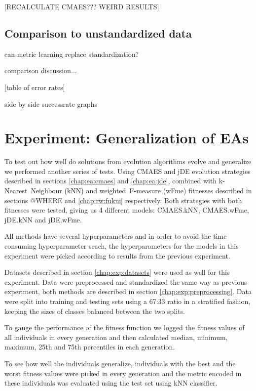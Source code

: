 \documentclass[12pt,a4paper]{report}
\begin{document}
[RECALCULATE CMAES??? WEIRD RESULTS] %


\subsection{Comparison to unstandardized data}

can metric learning replace standardization? %

comparison discussion... %

[table of error rates] %

side by side successrate graphs %


\section{Experiment: Generalization of EAs} \label{chap:exp:fitness}

To test out how well do solutions from evolution algorithms evolve and generalize we performed another series of tests. Using CMAES and jDE evolution strategies described in sections \ref{chap:ea:cmaes} and \ref{chap:ea:jde}, combined with k-Nearest~Neighbour (kNN) and weighted~F-measure (wFme) fitnesses described in sections @WHERE and \ref{chap:rw:fukui} respectively. Both strategies with both fitnesses were tested, giving us 4 different models: CMAES.kNN, CMAES.wFme, jDE.kNN and jDE.wFme.

All methods have several hyperparameters and in order to avoid the time consuming hyperparameter seach, the hyperparameters for the models in this experiment were picked according to results from the previous experiment.

Datasets described in section \ref{chap:exp:datasets} were used as well for this experiment. Data were preprocessed and standardized the same way as previous experiment, both methods are described in section \ref{chap:exp:preprocessing}. Data were split into training and testing sets using a 67:33 ratio in a stratified fashion, keeping the sizes of classes balanced between the two splits.

To gauge the performance of the fitness function we logged the fitness values of all individuals in every generation and then calculated median, minimum, maximum, 25th and 75th percentiles in each generation.

To see how well the individuals generalize, individuals with the best and the worst fitness values were picked in every generation and the metric encoded in these individuals was evaluated using the test set using kNN classifier.
\end{document}
